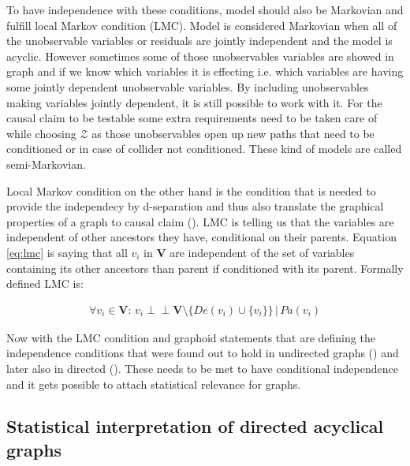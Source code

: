 \documentclass[main=english,12pt,a4paper,pdftex,econ,utf8]{aaltothesis}
\newcommand{\indep}{\perp \!\!\! \perp}
\newcommand{\pa}[1]{Pa(#1)}
\newcommand{\de}[1]{De(#1)}
\newcommand{\z}{\mathcal{Z}}
\newcommand{\vars}{\bm{V}}
\begin{document}


To have independence with these conditions, model should also be Markovian and fulfill local Markov condition (LMC). Model is considered Markovian when all of the unobservable variables or residuals are jointly independent and the model is acyclic. However sometimes some of those unobservables variables are showed in graph and if we know which variables it is effecting i.e. which variables are having some jointly dependent unobservable variables. By including unobservables making variables jointly dependent, it is still possible to work with it. For the causal claim to be testable some extra requirements need to be taken care of while choosing $\z$ as those unobservables open up new paths that need to be conditioned or in case of collider not conditioned. These kind of models are called semi-Markovian.

Local Markov condition on the other hand is the condition that is needed to provide the independecy by d-separation and thus also translate the graphical properties of a graph to causal claim (\cite{Heckman2015}). LMC is telling us that the variables are independent of other ancestors they have, conditional on their parents. Equation \ref{eq:lmc} is saying that all $v_i$ in $\vars$ are independent of the set of variables containing its other ancestors than parent if conditioned with its parent. Formally defined LMC is:

\begin{gather} \label{eq:lmc}
    \forall v_{i}\in\vars\text{: }v_{i}\indep\vars\setminus\{\de{v_{i}}\cup \{v_{i}\}\}\,|\,\pa{v_{i}}
\end{gather}

Now with the LMC condition and graphoid statements that are defining the independence conditions that were found out to hold in undirected graphs (\cite{Paz1985}) and later also in directed (\cite{Pearl1986}). These needs to be met to have conditional independence and it gets possible to attach statistical relevance for graphs.

\subsection{Statistical interpretation of directed acyclical graphs}
\end{document}
